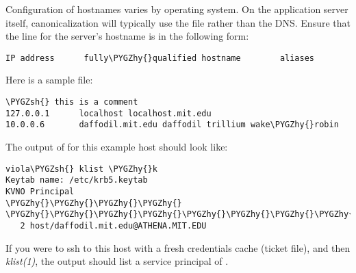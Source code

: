 \documentclass[letterpaper,10pt,english]{sphinxmanual}
\def\PYGZsh{\char`\#}
\def\PYGZhy{\char`\-}
\begin{document}
Configuration of hostnames varies by operating system.  On the
application server itself, canonicalization will typically use the
 file rather than the DNS.  Ensure that the line for the
server's hostname is in the following form:

\begin{Verbatim}[commandchars=\\\{\}]
IP address      fully\PYGZhy{}qualified hostname        aliases
\end{Verbatim}

Here is a sample  file:

\begin{Verbatim}[commandchars=\\\{\}]
\PYGZsh{} this is a comment
127.0.0.1      localhost localhost.mit.edu
10.0.0.6       daffodil.mit.edu daffodil trillium wake\PYGZhy{}robin
\end{Verbatim}

The output of  for this example host should look like:

\begin{Verbatim}[commandchars=\\\{\}]
viola\PYGZsh{} klist \PYGZhy{}k
Keytab name: /etc/krb5.keytab
KVNO Principal
\PYGZhy{}\PYGZhy{}\PYGZhy{}\PYGZhy{} \PYGZhy{}\PYGZhy{}\PYGZhy{}\PYGZhy{}\PYGZhy{}\PYGZhy{}\PYGZhy{}\PYGZhy{}\PYGZhy{}\PYGZhy{}\PYGZhy{}\PYGZhy{}\PYGZhy{}\PYGZhy{}\PYGZhy{}\PYGZhy{}\PYGZhy{}\PYGZhy{}\PYGZhy{}\PYGZhy{}\PYGZhy{}\PYGZhy{}\PYGZhy{}\PYGZhy{}\PYGZhy{}\PYGZhy{}\PYGZhy{}\PYGZhy{}\PYGZhy{}\PYGZhy{}\PYGZhy{}\PYGZhy{}\PYGZhy{}\PYGZhy{}\PYGZhy{}\PYGZhy{}\PYGZhy{}\PYGZhy{}\PYGZhy{}\PYGZhy{}\PYGZhy{}\PYGZhy{}\PYGZhy{}\PYGZhy{}\PYGZhy{}\PYGZhy{}\PYGZhy{}\PYGZhy{}\PYGZhy{}\PYGZhy{}\PYGZhy{}\PYGZhy{}\PYGZhy{}\PYGZhy{}\PYGZhy{}\PYGZhy{}\PYGZhy{}\PYGZhy{}\PYGZhy{}\PYGZhy{}
   2 host/daffodil.mit.edu@ATHENA.MIT.EDU
\end{Verbatim}

If you were to ssh to this host with a fresh credentials cache (ticket
file), and then \emph{klist(1)}, the output should list a service
principal of .
\end{document}

